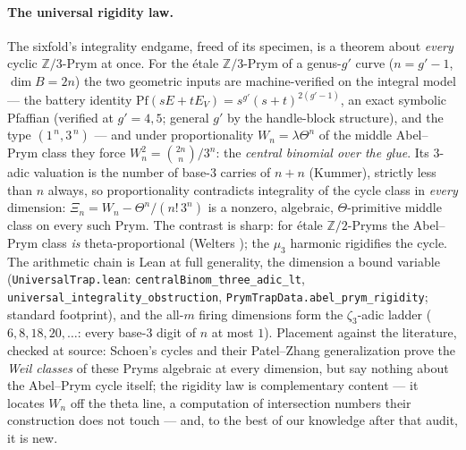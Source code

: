 \documentclass[11pt]{article}
\theoremstyle{definition}
\theoremstyle{remark}
\begin{document}
\paragraph{The universal rigidity law.} The sixfold's integrality endgame,
freed of its specimen, is a theorem about \emph{every} cyclic
$\mathbb Z/3$-Prym at once. For the \'etale $\mathbb Z/3$-Prym of a
genus-$g'$ curve ($n=g'-1$, $\dim B=2n$) the two geometric inputs are
machine-verified on the integral model --- the battery identity
$\mathrm{Pf}(sE+tE_V)=s^{g'}(s+t)^{2(g'-1)}$, an exact symbolic Pfaffian
(verified at $g'=4,5$; general $g'$ by the handle-block structure), and the
type $(1^{\,n},3^{\,n})$ \cite{LangeOrtega} --- and under proportionality
$W_n=\lambda\Theta^n$ of the middle Abel--Prym class they force
$W_n^2=\binom{2n}{n}/3^{n}$: the \emph{central binomial over the glue}. Its
$3$-adic valuation is the number of base-$3$ carries of $n+n$ (Kummer),
strictly less than $n$ always, so proportionality contradicts integrality of
the cycle class in \emph{every} dimension:
$\Xi_n=W_n-\Theta^n/(n!\,3^{n})$ is a nonzero, algebraic, $\Theta$-primitive
middle class on every such Prym. The contrast is sharp: for
\'etale $\mathbb Z/2$-Pryms the Abel--Prym class \emph{is}
theta-proportional (Welters \cite{Welters}); the $\mu_3$ harmonic rigidifies
the cycle. The arithmetic chain is Lean at full generality, the dimension a
bound variable (\texttt{UniversalTrap.lean}:
\texttt{centralBinom\_three\_adic\_lt},
\texttt{universal\_integrality\_obstruction},
\texttt{PrymTrapData.abel\_prym\_rigidity}; standard footprint), and the
all-$m$ firing dimensions form the $\zeta_3$-adic ladder ($6,8,18,20,\dots$:
every base-$3$ digit of $n$ at most $1$). Placement against the literature,
checked at source: Schoen's cycles and their Patel--Zhang generalization
\cite{PatelZhang} prove the \emph{Weil classes} of these Pryms algebraic at
every dimension, but say nothing about the Abel--Prym cycle itself; the
rigidity law is complementary content --- it locates $W_n$ off the theta
line, a computation of intersection numbers their construction does not
touch --- and, to the best of our knowledge after that audit, it is new.
\end{document}
